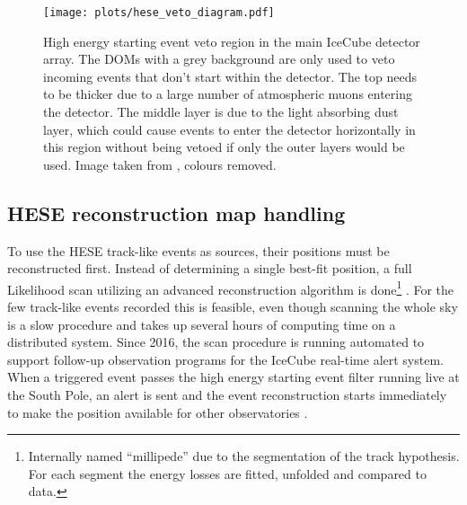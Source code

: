 \begin{figure}[htbp]
  \centering
  \texttt{[image: plots/hese\_veto\_diagram.pdf]}
  \caption[High energy starting event veto region]{
    High energy starting event veto region in the main IceCube detector array.
    The  DOMs with a grey background are only used to veto incoming events that don't start within the detector.
    The top needs to be thicker due to a large number of atmospheric muons entering the detector.
    The middle layer is due to the light absorbing dust layer, which could cause events to enter the detector horizontally in this region without being vetoed if only the outer layers would be used.
    Image taken from \cite{Aartsen:2013jdh}, colours removed.
  }
  \label{fig:data_hese_veto}
\end{figure}

\subsection{HESE reconstruction map handling}
To use the HESE track-like events as sources, their positions must be reconstructed first.
Instead of determining a single best-fit position, a full Likelihood scan utilizing an advanced reconstruction algorithm is done\footnote{Internally named \enquote{millipede} due to the segmentation of the track hypothesis. For each segment the energy losses are fitted, unfolded and compared to data.} \cite{Aartsen:2013vja}.
For the few track-like events recorded this is feasible, even though scanning the whole sky is a slow procedure and takes up several hours of computing time on a distributed system.
Since 2016, the scan procedure is running automated to support follow-up observation programs for the IceCube real-time alert system.
When a triggered event passes the high energy starting event filter running live at the South Pole, an alert is sent and the event reconstruction starts immediately to make the position available for other observatories \cite{Aartsen:2016lmt}.

